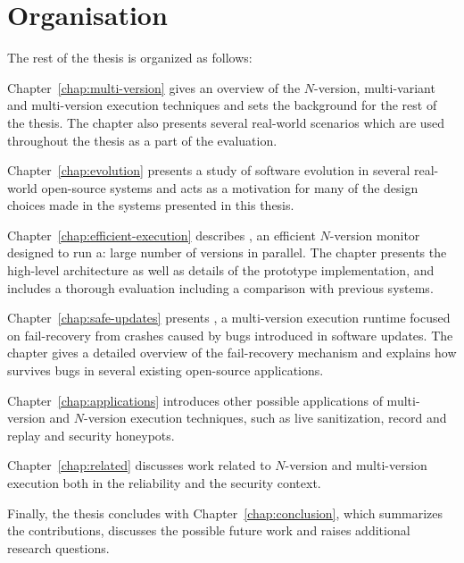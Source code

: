 \section{Organisation}
\label{overview:organisation}

The rest of the thesis is organized as follows:

\begin{chapterdescription}
\item[Chapter~\ref{chap:multi-version}] gives an overview of the $N$-version,
  multi-variant and multi-version execution techniques and sets the background
  for the rest of the thesis. The chapter also presents several real-world
  scenarios which are used throughout the thesis as a part of the evaluation.

\item[Chapter~\ref{chap:evolution}] presents a study of software evolution in
  several real-world open-source systems and acts as a motivation for many of
  the design choices made in the systems presented in this thesis.

\item[Chapter~\ref{chap:efficient-execution}] describes \varan, an efficient
  $N$-version monitor designed to run a: large number of versions in parallel.
  The chapter presents the high-level architecture as well as details of the
  prototype implementation, and includes a thorough evaluation including a
  comparison with previous systems.

\item[Chapter~\ref{chap:safe-updates}] presents \mx, a multi-version execution
  runtime focused on fail-recovery from crashes caused by bugs introduced in
  software updates. The chapter gives a detailed overview of the fail-recovery
  mechanism and explains how \mx survives bugs in several existing open-source
  applications.

\item[Chapter~\ref{chap:applications}] introduces other possible applications
  of multi-version and $N$-version execution techniques, such as live
  sanitization, record and replay and security honeypots.

\item[Chapter~\ref{chap:related}] discusses work related to $N$-version and
  multi-version execution both in the reliability and the security context.
\end{chapterdescription}

Finally, the thesis concludes with Chapter~\ref{chap:conclusion}, which
summarizes the contributions, discusses the possible future work and raises
additional research questions.

